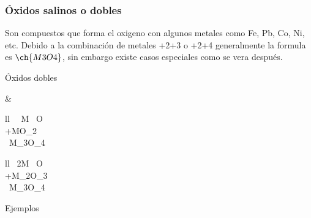 \subsubsection*{Óxidos salinos o dobles}
Son compuestos que forma el oxigeno con algunos metales como Fe, Pb, Co, Ni, etc. Debido a la combinación de metales +2+3 o +2+4 generalmente la formula es $\ch{M3O4}$, sin embargo existe casos especiales como se vera después.
\begin{Theorem*} {Óxidos dobles}
	\begin{figure}[H]
		\centering
	\end{figure}
	\begin{flalign*}
		&\begin{array} {ll}
			\ \ M \ O\\
			+MO_2\\\hline
			\ M_3O_4
		\end{array} \quad \begin{array} {ll}
		\ 2M \ O\\
		+M_2O_3\\\hline
		\ M_3O_4
		\end{array}
	\end{flalign*}
\end{Theorem*}
Ejemplos
